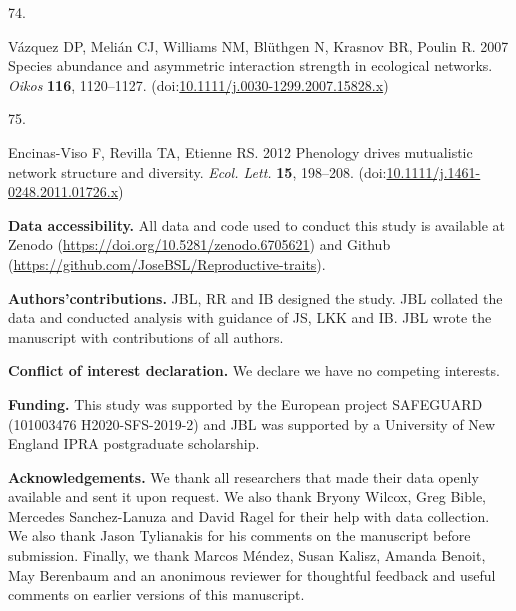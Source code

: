 \documentclass[
  12pt,
  a4paper,
]{article}
\newlength{\cslhangindent}
\newlength{\csllabelwidth}
\newlength{\cslentryspacingunit} %
\newenvironment{CSLReferences}[2] %
 {%
  \setlength{\parindent}{0pt}
  \ifodd #1
  \let\oldpar\par
  \def\par{\hangindent=\cslhangindent\oldpar}
  \fi
  \setlength{\parskip}{#2\cslentryspacingunit}
 }%
 {}
\newcommand{\CSLLeftMargin}[1]{\parbox[t]{\csllabelwidth}{#1}}
\newcommand{\CSLRightInline}[1]{\parbox[t]{\linewidth - \csllabelwidth}{#1}\break}
\begin{document}
\begin{CSLReferences}{0}{0}
\leavevmode{}%
\CSLLeftMargin{74. }
\CSLRightInline{Vázquez DP, Melián CJ, Williams NM, Blüthgen N, Krasnov BR, Poulin R. 2007 Species abundance and asymmetric interaction strength in ecological networks. \emph{Oikos} \textbf{116}, 1120--1127. (doi:\href{https://doi.org/10.1111/j.0030-1299.2007.15828.x}{10.1111/j.0030-1299.2007.15828.x})}

\leavevmode{}%
\CSLLeftMargin{75. }
\CSLRightInline{Encinas-Viso F, Revilla TA, Etienne RS. 2012 Phenology drives mutualistic network structure and diversity. \emph{Ecol. Lett.} \textbf{15}, 198--208. (doi:\href{https://doi.org/10.1111/j.1461-0248.2011.01726.x}{10.1111/j.1461-0248.2011.01726.x})}

\end{CSLReferences}

\textbf{Data accessibility.} All data and code used to conduct this study is available at Zenodo (\url{https://doi.org/10.5281/zenodo.6705621}) and Github (\url{https://github.com/JoseBSL/Reproductive-traits}).

\textbf{Authors'contributions.} JBL, RR and IB designed the study. JBL collated the data and conducted analysis with guidance of JS, LKK and IB. JBL wrote the manuscript with contributions of all authors.

\textbf{Conflict of interest declaration.} We declare we have no competing interests.

\textbf{Funding.} This study was supported by the European project SAFEGUARD (101003476 H2020-SFS-2019-2) and JBL was supported by a University of New England IPRA postgraduate scholarship.

\textbf{Acknowledgements.} We thank all researchers that made their data openly available and sent it upon request. We also thank Bryony Wilcox, Greg Bible, Mercedes Sanchez-Lanuza and David Ragel for their help with data collection. We also thank Jason Tylianakis for his comments on the manuscript before submission. Finally, we thank Marcos Méndez, Susan Kalisz, Amanda Benoit, May Berenbaum and an anonimous reviewer for thoughtful feedback and useful comments on earlier versions of this manuscript.
\end{document}
